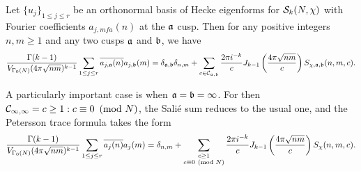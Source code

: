     \begin{theorem}
      Let $\{u_{j}\}_{1 \le j \le r}$ be an orthonormal basis of Hecke eigenforms for $\mathcal{S}_{k}(N,\chi)$ with Fourier coefficients $a_{j,
      mf{a}}(n)$ at the $\mathfrak{a}$ cusp. Then for any positive integers $n,m \ge 1$ and any two cusps $\mathfrak{a}$ and $\mathfrak{b}$, we have
      \[
        \frac{\Gamma(k-1)}{V_{\Gamma_{0}(N)}(4\pi \sqrt{nm})^{k-1}}\sum_{1 \le j \le r}\overline{a_{j,\mathfrak{a}}(n)}a_{j,\mathfrak{b}}(m) = \delta_{\mathfrak{a},\mathfrak{b}}\delta_{n,m}+\sum_{c \in \mathcal{C}_{\mathfrak{a},\mathfrak{b}}}\frac{2\pi i^{-k}}{c}J_{k-1}\left(\frac{4\pi\sqrt{nm}}{c}\right)S_{\chi,\mathfrak{a},\mathfrak{b}}(n,m,c).
      \]
    \end{theorem}

    A particularly important case is when $\mathfrak{a} = \mathfrak{b} = \infty$. For then $\mathcal{C}_{\infty,\infty} = {c \ge 1:c \equiv 0 \ \left(\text{mod }N\right)}$, the Sali\'e sum reduces to the usual one, and the Petersson trace formula takes the form
    \[
      \frac{\Gamma(k-1)}{V_{\Gamma_{0}(N)}(4\pi \sqrt{nm})^{k-1}}\sum_{1 \le j \le r}\overline{a_{j}(n)}a_{j}(m) = \delta_{n,m}+\sum_{\substack{c \ge 1 \\ c \equiv 0 \ \left(\text{mod }N\right)}}\frac{2\pi i^{-k}}{c}J_{k-1}\left(\frac{4\pi\sqrt{nm}}{c}\right)S_{\chi}(n,m,c).
    \]